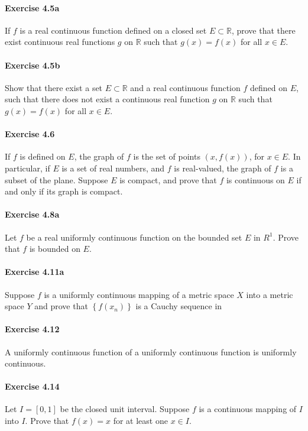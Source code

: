 \documentclass{article}
\begin{document}
\paragraph{Exercise 4.5a} If $f$ is a real continuous function defined on a closed set $E \subset \mathbb{R}$, prove that there exist continuous real functions $g$ on $\mathbb{R}$ such that $g(x)=f(x)$ for all $x \in E$.

\paragraph{Exercise 4.5b} Show that there exist a set $E \subset \mathbb{R}$ and a real continuous function $f$ defined on $E$, such that there does not exist a continuous real function $g$ on $\mathbb{R}$ such that $g(x)=f(x)$ for all $x \in E$.

\paragraph{Exercise 4.6} If $f$ is defined on $E$, the graph of $f$ is the set of points $(x, f(x))$, for $x \in E$. In particular, if $E$ is a set of real numbers, and $f$ is real-valued, the graph of $f$ is a subset of the plane. Suppose $E$ is compact, and prove that $f$ is continuous on $E$ if and only if its graph is compact.

\paragraph{Exercise 4.8a} Let $f$ be a real uniformly continuous function on the bounded set $E$ in $R^{1}$. Prove that $f$ is bounded on $E$.

\paragraph{Exercise 4.11a} Suppose $f$ is a uniformly continuous mapping of a metric space $X$ into a metric space $Y$ and prove that $\left\{f\left(x_{n}\right)\right\}$ is a Cauchy sequence in

\paragraph{Exercise 4.12} A uniformly continuous function of a uniformly continuous function is uniformly continuous.

\paragraph{Exercise 4.14} Let $I=[0,1]$ be the closed unit interval. Suppose $f$ is a continuous mapping of $I$ into $I$. Prove that $f(x)=x$ for at least one $x \in I$.
\end{document}
